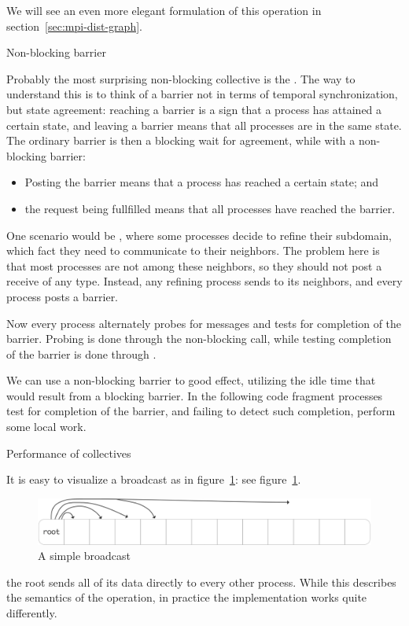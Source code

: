 We will see an even more elegant formulation of this operation
in section~\ref{sec:mpi-dist-graph}.

 {Non-blocking barrier}
\label{sec:ibarrier}

Probably the most surprising non-blocking collective is the
. The way to understand this is to think of
a barrier not in terms of temporal synchronization, but state
agreement: reaching a barrier is a sign that a process has attained a
certain state, and leaving a barrier means that all processes are in
the same state. The ordinary barrier is then a blocking wait for
agreement, while with a non-blocking barrier:
\begin{itemize}
\item Posting the barrier means that a process has reached a certain
  state; and
\item the request being fullfilled means that all processes have
  reached the barrier.
\end{itemize}

One scenario would be , where
some processes decide to refine their subdomain, which
fact they need to communicate to their neighbors.
The problem here is that most processes are not among these neighbors,
so they should not post a receive of any type.
Instead, any refining process sends to its neighbors,
and every process posts a barrier.


Now every process alternately probes for messages
and tests for completion of the barrier.
Probing is done through the non-blocking  call,
while testing completion of the barrier is done through
.


We can use a non-blocking barrier to good effect, utilizing the idle
time that would result from a blocking barrier. In the following code
fragment processes test for completion of the barrier, and failing to
detect such completion, perform some local work.


 {Performance of collectives}

It is easy to visualize a broadcast as in figure~\ref{fig:bcast-simple}:
see figure~\ref{fig:bcast-simple}.
\begin{figure}[ht]
  \includegraphics[scale=.08]{graphics/bcast-simple}
  \caption{A simple broadcast}
  \label{fig:bcast-simple}
\end{figure}
the root sends all of its data directly to every other process.
While this describes the semantics of the operation, in practice
the implementation works quite differently.

